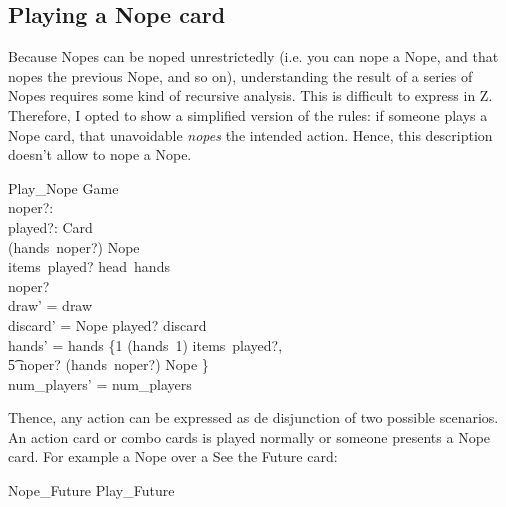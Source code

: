\documentclass[11pt, fuzz]{article}
\begin{document}
\subsection{Playing a Nope card}


Because Nopes can be noped unrestrictedly (i.e. you can nope a Nope, and that nopes the previous Nope, and so on), understanding the result of a series of Nopes requires some kind of recursive analysis. This is difficult to express in Z. Therefore, I opted to show a simplified version of the rules: if someone plays a Nope card, that unavoidable \emph{nopes} the intended action. Hence, this description doesn't allow to nope a Nope.


\begin{schema}{Play\_Nope}
    \Delta Game \\
    noper?: \nat \\
    played?: \seq Card \\
\where
    (hands~noper?) \bcount Nope  \\
    items~played? \subbageq head~hands \\
    noper?  \\
    draw' = draw \\
    discard' = \langle Nope \rangle \cat played? \cat discard \\
    hands' = hands \oplus \{1 \mapsto (hands~1) \uminus items~played?,\\ \t5 noper? \mapsto (hands~noper?) \uminus \lbag Nope \rbag \} \\
    num\_players' = num\_players
\end{schema}

Thence, any action can be expressed as de disjunction of two possible scenarios. An action card or combo cards is played normally or someone presents a Nope card. For example a Nope over a See the Future card:

\begin{zed}
    Nope\_Future  Play\_Future \lor [Play\_Nope | played? = \langle Future \rangle]
\end{zed}
\end{document}

